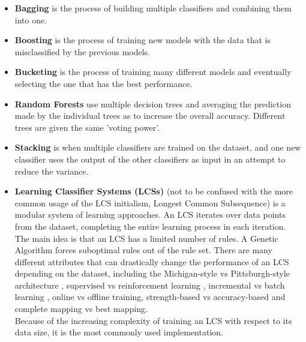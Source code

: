 \begin{itemize}
	\item \textbf{Bagging}
		is the process of building multiple classifiers and combining them into one.
	\item \textbf{Boosting}
		is the process of training new models with the data that is misclassified by the previous models.
	\item \textbf{Bucketing}
		is the process of training many different models and eventually selecting the one that has the best performance.
	\item \textbf{Random Forests}\cite{Breiman2001}
		use multiple decision trees and averaging the prediction made by the individual trees as to increase the overall accuracy. Different trees are given the same 'voting power'.
	\item \textbf{Stacking}
		is when multiple classifiers are trained on the dataset, and one new classifier uses the output of the other classifiers as input in an attempt to reduce the variance.
	\item \textbf{Learning Classifier Systems (LCSs)}
		(not to be confused with the more common usage of the LCS initialism, Longest Common Subsequence) is a modular system of learning approaches. An LCS iterates over data points from the dataset, completing the entire learning process in each iteration. The main idea is that an LCS has a limited number of rules. A Genetic Algorithm forces suboptimal rules out of the rule set. There are many different attributes that can drastically change the performance of an LCS depending on the dataset, including the Michigan-style vs Pittsburgh-style architecture \cite{Puig09}, supervised vs reinforcement learning \cite{kaelbling1996reinforcement}, incremental vs batch learning \cite{clearwater1989incremental}, online vs offline training, strength-based vs accuracy-based \cite{wilson1995classifier} and complete mapping vs best mapping.\\		
		Because of the increasing complexity of training an LCS with respect to its data size, it is the most commonly used implementation.
\end{itemize}


%
%


